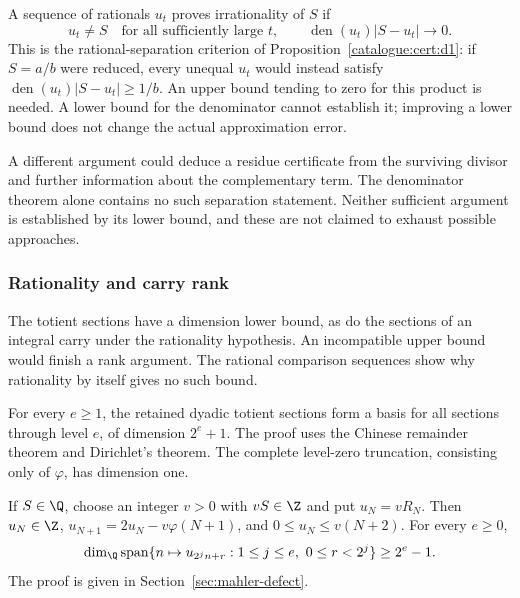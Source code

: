 \begin{prop}\label{prop:additional-approximation-hypothesis}
A sequence of rationals $u_t$ proves irrationality of $S$ if
\[
 u_t\ne S\quad\text{for all sufficiently large }t,
 \qquad \operatorname{den}(u_t)|S-u_t|\longrightarrow0.
\]
This is the rational-separation criterion of
Proposition~\ref{catalogue:cert:d1}:
if $S=a/b$ were reduced, every unequal $u_t$ would instead satisfy
$\operatorname{den}(u_t)|S-u_t|\ge1/b$. An upper bound tending to zero
for this product is needed. A lower bound for the denominator cannot
establish it; improving a lower bound does not change the actual
approximation error.

A different argument could deduce a residue certificate from the
surviving divisor and further information about the complementary
term. The denominator theorem alone contains no such separation
statement. Neither sufficient argument is established by its lower
bound, and these are not claimed to exhaust possible approaches.
\end{prop}

\subsubsection{Rationality and carry rank}

The totient sections have a dimension lower bound, as do the sections of
an integral carry under the rationality hypothesis. An incompatible
upper bound would finish a rank argument. The rational comparison
sequences show why rationality by itself gives no such bound.

\begin{thm}\label{thm:rationality-carry-rank}
For every $e\ge1$, the retained dyadic totient sections form a basis for
all sections through level $e$, of dimension $2^e+1$. The proof uses the
Chinese remainder theorem and Dirichlet's theorem. The complete level-zero
truncation, consisting only of $\varphi$, has dimension one.
\end{thm}

\begin{thm}\label{thm:rationality-carry-rank-2}
If $S\in\Q$, choose an integer $v>0$
with $vS\in\Z$ and put $u_N=vR_N$. Then $u_N\in\Z$,
$u_{N+1}=2u_N-v\varphi(N+1)$, and $0\le u_N\le v(N+2)$. For every $e\ge0$,
\[
 \dim_{\Q}\operatorname{span}
 \{n\mapsto u_{2^j n+r}:1\le j\le e,\ 0\le r<2^j\}\ge2^e-1.
\]
The proof is given in Section~\ref{sec:mahler-defect}.
\end{thm}

